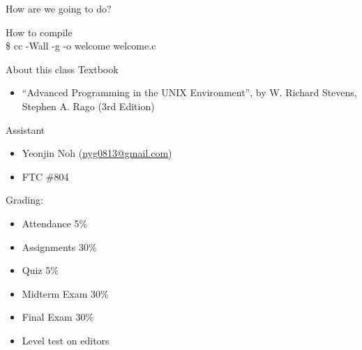 \documentclass[newPxFont,sthlmFooter,nooffset]{beamer}
\begin{document}
\begin{frame}[t]{How are we going to do?}


How to compile \\
\$ cc -Wall -g -o welcome welcome.c
\end{frame}


\begin{frame}[t]{About this class}
Textbook
\begin{itemize}
	\item ``Advanced Programming in the UNIX Environment'', by
		W. Richard Stevens, Stephen A. Rago (3rd Edition)
\end{itemize}
\bigskip
Assistant
\begin{itemize}
	\item Yeonjin Noh (\href{mailto:nyg0813@gmail.com }{nyg0813@gmail.com})
	\item FTC \#804
\end{itemize}
\bigskip


\bigskip
Grading:
\vspace{-1em}
\begin{multicols}{2}
\begin{itemize}
	\item Attendance 5$\%$
	\item Assignments 30$\%$
	\item Quiz 5$\%$
	\item Midterm Exam 30$\%$
	\item Final Exam 30$\%$
	\item Level test on editors
\end{itemize}
\end{multicols}
\end{frame}
\end{document}
